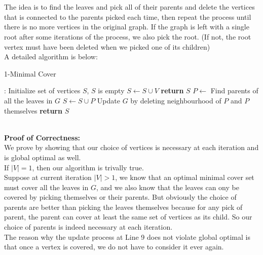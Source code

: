 \documentclass[12pt,letterpaper]{article}
\begin{document}
\newpage
\section{}
\subsection{}
The idea is to find the leaves and pick all of their parents and delete the vertices that is connected to the parents picked each time,
then repeat the process until there is no more vertices in the original graph. 
If the graph is left with a single root after some iterations of the process,
we also pick the root. 
(If not, the root vertex must have been deleted when we picked one of its children)\\
A detailed algorithm is below:\\ 
\begin{algorithm}
  \caption{1-Minimal Cover}\label{alg:1cover}
  \begin{algorithmic}[1]
  :
  \State Initialize set of vertices $S$, $S$ is empty
  \State $S\gets S\cup V$
  \State \textbf{return} $S$
  \EndIf
  \State $P\gets$ Find parents of all the leaves in $G$
  \State $S\gets S\cup P$
  \State Update $G$ by deleting neighbourhood of $P$ and $P$ themselves
  \EndWhile
  \State \textbf{return} $S$
  \EndProcedure
  \end{algorithmic}
\end{algorithm}\\
\textbf{Proof of Correctness:}\\
We prove by showing that our choice of vertices is necessary at each iteration 
and is global optimal as well.\\
If $|V|=1$, then our algorithm is trivally true.\\
Suppose at current iteration $|V|>1$, 
we know that an optimal minimal cover set must cover all the leaves in $G$,
and we also know that the leaves can ony be covered by picking themselves or their parents.
But obviously the choice of parents are better than picking the leaves themselves 
because for any pick of parent, 
the parent can cover at least the same set of vertices as its child.
So our choice of parents is indeed necessary at each iteration.\\
The reason why the update process at Line 9 does not violate global optimal is that
once a vertex is covered, 
we do not have to consider it ever again.
\end{document}
